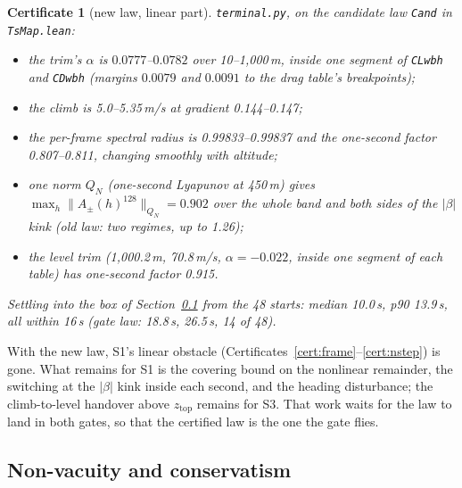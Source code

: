 \documentclass[11pt]{article}
\newtheorem{cert}{Certificate}
\newcommand{\zTop}{z_{\mathrm{top}}}
\begin{document}
\begin{cert}[new law, linear part]\label{cert:newlaw}
\texttt{terminal.py}, on the candidate law \texttt{Cand} in \texttt{TsMap.lean}:
\begin{itemize}
\item the trim's $\alpha$ is $0.0777$--$0.0782$ over 10--1{,}000\,m, inside one segment of \texttt{CLwbh} and \texttt{CDwbh} (margins $0.0079$ and $0.0091$ to the drag table's breakpoints);
\item the climb is 5.0--5.35\,m/s at gradient 0.144--0.147;
\item the per-frame spectral radius is 0.99833--0.99837 and the one-second factor 0.807--0.811, changing smoothly with altitude;
\item one norm $Q_N$ (one-second Lyapunov at 450\,m) gives $\max_h \|A_\pm(h)^{128}\|_{Q_N} = 0.902$ over the whole band and both sides of the $|\beta|$ kink (old law: two regimes, up to 1.26);
\item the level trim (1{,}000.2\,m, 70.8\,m/s, $\alpha = -0.022$, inside one segment of each table) has one-second factor 0.915.
\end{itemize}
Settling into the box of Section~\ref{sec:conserv} from the 48 starts: median 10.0\,s, p90 13.9\,s, all within 16\,s (gate law: 18.8\,s, 26.5\,s, 14 of 48).
\end{cert}

With the new law, S1's linear obstacle (Certificates~\ref{cert:frame}--\ref{cert:nstep}) is gone. What remains for S1 is the covering bound on the nonlinear remainder, the switching at the $|\beta|$ kink inside each second, and the heading disturbance; the climb-to-level handover above $\zTop$ remains for S3. That work waits for the law to land in both gates, so that the certified law is the one the gate flies.

\subsection{Non-vacuity and conservatism}\label{sec:conserv}
\end{document}
